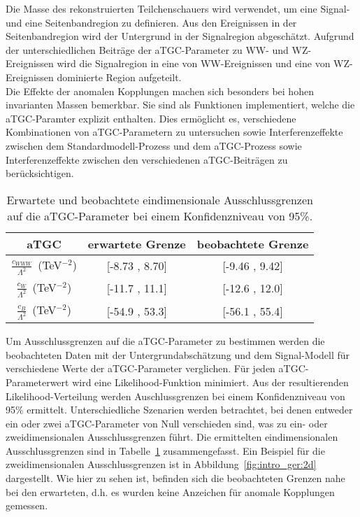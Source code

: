 Die Masse des rekonstruierten Teilchenschauers wird verwendet, um eine Signal- und eine Seitenbandregion zu  definieren. Aus den Ereignissen in der Seitenbandregion wird der Untergrund in der Signalregion abgeschätzt. Aufgrund der unterschiedlichen Beiträge der aTGC-Parameter zu WW- und WZ-Ereignissen wird die Signalregion in eine von WW-Ereignissen und eine von WZ-Ereignissen dominierte Region aufgeteilt. \\

Die Effekte der anomalen Kopplungen machen sich besonders bei hohen invarianten Massen bemerkbar. Sie sind als Funktionen implementiert, welche die aTGC-Paramter explizit enthalten. Dies ermöglicht es, verschiedene Kombinationen von aTGC-Parametern zu untersuchen sowie Interferenzeffekte zwischen dem Standardmodell-Prozess und dem aTGC-Prozess sowie Interferenzeffekte zwischen den verschiedenen aTGC-Beiträgen zu berücksichtigen.\\

\begin{table}
	\centering
	\caption[Erwartete und beobachtete Ausschlussgrenzen bei einem Konfidenzniveau von 95\%]{Erwartete und beobachtete eindimensionale Ausschlussgrenzen auf die aTGC-Parameter bei einem Konfidenzniveau von 95\%.}
	\label{tab:intro_ger:1d}
	\begin{tabular}{ccc}
	\hline
	aTGC              &     erwartete Grenze & beobachtete Grenze\\
	\hline
	$\frac{c_{WWW}}{\Lambda ^2}$~(TeV$^{-2}$) &  [-8.73 , 8.70] &  [-9.46 , 9.42] \\
	$\frac{c_{W}}{\Lambda ^2}$~(TeV$^{-2}$)   &  [-11.7 , 11.1] &  [-12.6 , 12.0] \\
	$\frac{c_{B}}{\Lambda ^2}$~(TeV$^{-2}$)   & [-54.9 , 53.3] &  [-56.1 , 55.4] \\
	\hline
	\end{tabular}
\end{table}

Um Ausschlussgrenzen auf die aTGC-Parameter zu bestimmen werden die beobachteten Daten mit der Untergrundabschätzung und dem Signal-Modell für verschiedene Werte der aTGC-Parameter verglichen. Für jeden aTGC-Parameterwert wird eine Likelihood-Funktion minimiert. Aus der resultierenden Likelihood-Verteilung werden Auschlussgrenzen bei einem Konfidenzniveau von 95\% ermittelt. Unterschiedliche Szenarien werden betrachtet, bei denen entweder ein oder zwei aTGC-Parameter von Null verschieden sind, was zu ein- oder zweidimensionalen Ausschlussgrenzen führt. Die ermittelten eindimensionalen Ausschlussgrenzen sind in Tabelle~\ref{tab:intro_ger:1d} zusammengefasst. Ein Beispiel für die zweidimensionalen Ausschlussgrenzen ist in Abbildung~\ref{fig:intro_ger:2d} dargestellt. Wie hier zu sehen ist, befinden sich die beobachteten Grenzen nahe bei den erwarteten, d.h. es wurden keine Anzeichen für anomale Kopplungen gemessen.\\

